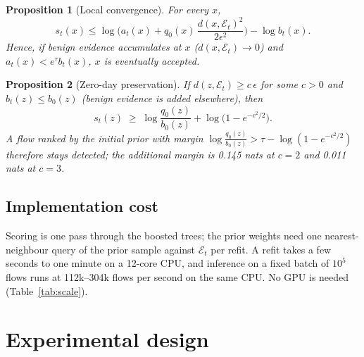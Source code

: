 \documentclass[a4paper,fleqn]{cas-dc}
\newcommand{\E}{\mathcal{E}}
\newtheorem{proposition}{Proposition}
\begin{document}
\begin{proposition}[Local convergence]\label{prop:p2}
For every $x$,
\begin{equation}
s_t(x)\le \log\!\Big(a_t(x)+q_0(x)\,\frac{d(x,\E_t)^2}{2\epsilon^2}\Big)-\log b_t(x).
\end{equation}
Hence, if benign evidence accumulates at $x$ ($d(x,\E_t)\to0$) and $a_t(x)<e^{\tau}b_t(x)$, $x$ is eventually accepted.
\end{proposition}

\begin{proposition}[Zero-day preservation]\label{prop:p3}
If $d(z,\E_t)\ge c\,\epsilon$ for some $c>0$ and $b_t(z)\le b_0(z)$ (benign evidence is added elsewhere), then
\begin{equation}
s_t(z)\;\ge\;\log\frac{q_0(z)}{b_0(z)}+\log\!\big(1-e^{-c^2/2}\big).
\end{equation}
A flow ranked by the initial prior with margin $\log\frac{q_0(z)}{b_0(z)}>\tau-\log(1-e^{-c^2/2})$ therefore stays detected; the additional margin is 0.145 nats at $c=2$ and 0.011 nats at $c=3$.
\end{proposition}

\subsection{Implementation cost}
Scoring is one pass through the boosted trees; the prior weights need one nearest-neighbour query of the prior sample against $\E_t$ per refit. A refit takes a few seconds to one minute on a 12-core CPU, and inference on a fixed batch of $10^5$ flows runs at 112k--304k flows per second on the same CPU. No GPU is needed (Table~\ref{tab:scale}).

\section{Experimental design}
\label{sec:experiments}
\end{document}
